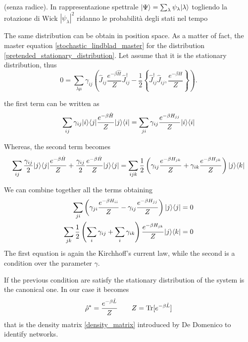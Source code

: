 (senza radice).
In rappresentazione spettrale $\lvert\Psi\rangle=\sum_\lambda \psi_\lambda \lvert\lambda\rangle$ togliendo la rotazione di Wick $|\psi_\lambda|^2$ ridanno le probabilità degli stati nel tempo



\newpage
The same distribution can be obtain in position space. As a matter of fact, the master equation \eqref{stochastic_lindblad_master} for the distribution \eqref{pretended_stationary_distribution}. Let assume that it is the stationary distribution, thus
\begin{equation}
    0 = \sum_{\lambda\mu} \gamma_{ij} \left(\hat J_{ij}  \frac{e^{-\beta\hat H}}{Z} \hat J^\dagger_{ij} - \frac{1}{2}\left\{ \hat J^\dagger_{ij}\hat J_{ij},  \frac{e^{-\beta\hat H}}{Z}\right\} \right).
\end{equation}

the first term can be written as
\begin{equation}
    \sum_{ij} \gamma_{ij} \lvert i\rangle\langle j\rvert  \frac{e^{-\beta\hat H}}{Z} \lvert j\rangle\langle i\rvert = 
    \sum_{ji} \gamma_{ij} \frac{e^{-\beta H_{jj}}}{Z} \lvert i\rangle\langle i\rvert
\end{equation}

Whereas, the second term becomes
\begin{equation}
    \sum_{ij}\frac{\gamma_{ij}}{2}\lvert j\rangle\langle j\rvert \frac{e^{-\beta\hat H}}{Z} + \frac{\gamma_{ij}}{2}\frac{e^{-\beta\hat H}}{Z}\lvert j\rangle\langle j\rvert=
    \sum_{ijk} \frac{1}{2}\left(\gamma_{ij}\frac{e^{-\beta H_{jk}}}{Z} + \gamma_{ik}\frac{e^{-\beta H_{jk}}}{Z}\right)\lvert j\rangle\langle k\rvert
\end{equation}

We can combine together all the terms obtaining
\begin{equation}
    \begin{split}
        \sum_{ji} \left(\gamma_{ji}\frac{e^{-\beta H_{ii}}}{Z} - \gamma_{ij}\frac{e^{-\beta H_{jj}}}{Z}\right)\lvert j\rangle\langle j\rvert = 0\\
        \sum_{jk} \frac{1}{2}\left(\sum_i\gamma_{ij} + \sum_i\gamma_{ik}   \right)\frac{e^{-\beta H_{jk}}}{Z}\lvert j\rangle\langle k\rvert = 0\\
    \end{split}
\end{equation}
The first equation is again the Kirchhoff's current law, while the second is a condition over the parameter $\gamma$.

If the previous condition are satisfy the stationary distribution of the system is the canonical one. In our case it becomes
\begin{equation}
    \hat\rho^* = \frac{e^{-\beta\hat L}}{Z} \qquad Z = \operatorname{Tr}[e^{-\beta\hat L}]  
\end{equation}
that is the density matrix \eqref{density_matrix} introduced by De Domenico to identify networks.